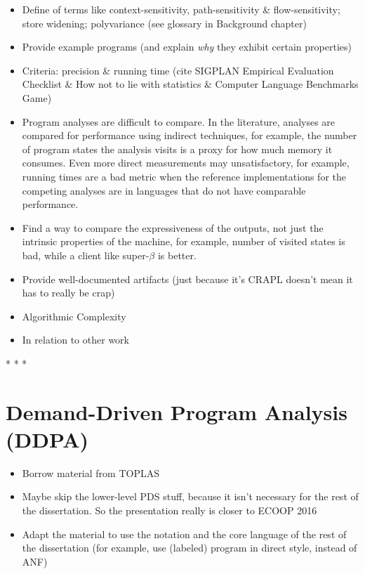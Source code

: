 \documentclass[12pt, oneside]{book}
\begin{document}
\begin{itemize}
  \item Define of terms like context-sensitivity, path-sensitivity \& flow-sensitivity; store widening; polyvariance (see glossary in Background chapter)
  \item Provide example programs (and explain \emph{why} they exhibit certain properties)
  \item Criteria: precision \& running time (cite SIGPLAN Empirical Evaluation Checklist \& How not to lie with statistics \& Computer Language Benchmarks Game)
  \item Program analyses are difficult to compare. In the literature, analyses are compared for performance using indirect techniques, for example, the number of program states the analysis visits is a proxy for how much memory it consumes. Even more direct measurements may unsatisfactory, for example, running times are a bad metric when the reference implementations for the competing analyses are in languages that do not have comparable performance.
  \item Find a way to compare the expressiveness of the outputs, not just the intrinsic properties of the machine, for example, number of visited states is bad, while a client like super-\(β\) is better.
  \item Provide well-documented artifacts (just because it’s CRAPL doesn’t mean it has to really be crap)
  \item Algorithmic Complexity
  \item In relation to other work
\end{itemize}

* * *

\section{Demand-Driven Program Analysis (DDPA)}

\begin{itemize}
  \item Borrow material from TOPLAS
  \item Maybe skip the lower-level PDS stuff, because it isn’t necessary for the rest of the dissertation. So the presentation really is closer to ECOOP 2016
  \item Adapt the material to use the notation and the core language of the rest of the dissertation (for example, use (labeled) program in direct style, instead of ANF)
\end{itemize}
\end{document}
